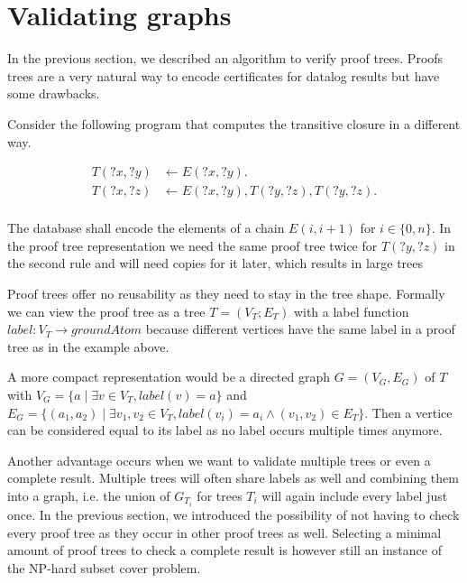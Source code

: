 \section{Validating graphs}\label{sec:valGraph}

In the previous section, we described an algorithm to verify proof trees. Proofs trees are a very natural way to encode certificates for datalog results but have some drawbacks. 

\begin{example}\label{ex:treeGraph}
    Consider the following program that computes the transitive closure in a different way.

    \begin{equation}
        \begin{split}
            T(?x,?y) &\leftarrow E(?x,?y). \\
            T(?x,?z) &\leftarrow E(?x,?y), T(?y, ?z), T(?y, ?z). \\
        \end{split}
    \end{equation}

    The database shall encode the elements of a chain $E(i, i+1)$ for $i \in \{0, n\}$. In the proof tree representation we need the same proof tree twice for $T(?y, ?z)$ in the second rule and will need copies for it later, which results in large trees 
\end{example}

Proof trees offer no reusability as they need to stay in the tree shape. Formally we can view the proof tree as a tree $T= (V_T;E_T)$ with a label function $label: V_T \to groundAtom$ because different vertices have the same label in a proof tree as in the example above.

A more compact representation would be a directed graph $G=(V_G, E_G)$ of $T$  with $V_G = \{a \mid \exists v \in V_T, label(v)=a\}$ and $E_G = \{ (a_1, a_2) \mid \exists v_1, v_2 \in V_T,  label(v_i) = a_i \land (v_1, v_2) \in E_T\}$. Then a vertice can be considered equal to its label as no label occurs multiple times anymore.



Another advantage occurs when we want to validate multiple trees or even a complete result. Multiple trees will often share labels as well and combining them into a graph, i.e. the union of $G_{T_i}$ for trees $T_i$ will again include every label just once. In the previous section, we introduced the possibility of not having to check every proof tree as they occur in other proof trees as well. Selecting a minimal amount of proof trees to check a complete result is however still an instance of the NP-hard subset cover problem.

